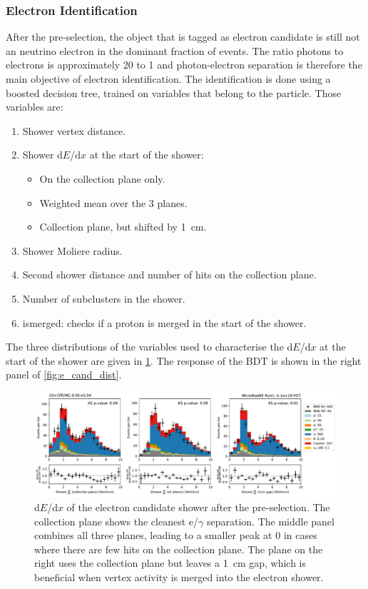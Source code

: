 \subsubsection{Electron Identification}
After the pre-selection, the object that is tagged as electron candidate is still not an neutrino electron in the dominant fraction of events. The ratio photons to electrons is approximately 20 to 1 and photon-electron separation is therefore the main objective of electron identification. The identification is done using a boosted decision tree, trained on variables that belong to the particle. Those variables are:
\begin{enumerate}
    \item Shower vertex distance.
    \item Shower d$E$/d$x$ at the start of the shower:
    \begin{itemize}
        \item On the collection plane only.
        \item Weighted mean over the 3 planes.
        \item Collection plane, but shifted by \SI{1}{\cm}. 
    \end{itemize}
    \item Shower Moliere radius.
    \item Second shower distance and number of hits on the collection plane.
    \item Number of subclusters in the shower.
    \item ismerged: checks if a proton is merged in the start of the shower.
\end{enumerate}

The three distributions of the variables used to characterise the d$E$/d$x$ at the start of the shower are given in \cref{fig:e_cand_dedx}. The response of the BDT is shown in the right panel of \cref{fig:e_cand_dist}.

\begin{figure}
    \centering
    \includegraphics[width=\textwidth]{NueCCsel/Images/run1/e_cand_dedx.pdf}
    \caption{d$E$/d$x$ of the electron candidate shower after the pre-selection. The collection plane shows the cleanest e/$\gamma$ separation. The middle panel combines all three planes, leading to a smaller peak at 0 in cases where there are few hits on the collection plane. The plane on the right uses the collection plane but leaves a \SI{1}{\cm} gap, which is beneficial when vertex activity is merged into the electron shower.}
    \label{fig:e_cand_dedx}
\end{figure}

